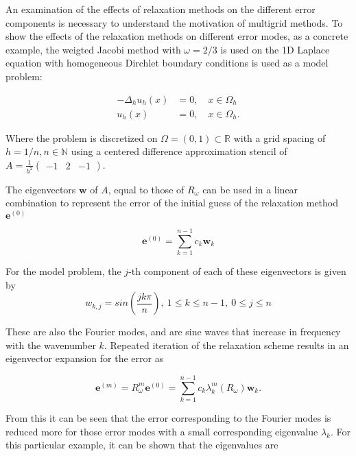 An examination of the effects of relaxation methods on the different error components is necessary to understand the motivation of multigrid methods.
To show the effects of the relaxation methods on different error modes, as a concrete example, the weigted Jacobi method with $\omega = 2/3$ is used on the 1D Laplace equation with homogeneous Dirchlet boundary conditions is used as a model problem:

\begin{equation}
\begin{aligned}
	-\Delta_h u_h(x) &= 0, \quad x \in \Omega_h \\
	u_h(x) &= 0, \quad x \in \Omega_h.
\end{aligned}
\label{eq:model_problem}
\end{equation}

Where the problem is discretized on $\Omega = (0, 1) \subset \mathbb{R}$ with a grid spacing of $h = 1/n, n \in \mathbb{N}$ using a centered difference approximation stencil of $A = \frac{1}{h^2} \begin{pmatrix} -1 & 2 &-1 \end{pmatrix}$.

The eigenvectors $\mathbf{w}$ of $A$, equal to those of $R_{\omega}$ can be used in a linear combination to represent the error of the initial guess of the relaxation method $\mathbf{e}^{(0)}$

\begin{equation}
	\mathbf{e}^{(0)} = \sum_{k=1}^{n-1}{c_{k}\mathbf{w}_{k}}
\end{equation}

For the model problem, the $j$-th component of each of these eigenvectors is given by
\begin{equation}
	w_{k,j} = sin\left(\frac{jk\pi}{n}\right),\ 1 \leq k \leq n-1,\ 0 \leq j \leq n
\end{equation}

These are also the Fourier modes, and are sine waves that increase in frequency with the wavenumber $k$. Repeated iteration of the relaxation scheme results in an eigenvector expansion for the error as

\begin{equation}
	\mathbf{e}^{(m)} = R_{\omega}^m \mathbf{e}^{(0)} = \sum_{k=1}^{n-1}{c_k\lambda_k^m\left( R_{\omega}\right)\mathbf{w}_k}.
\end{equation}

From this it can be seen that the error corresponding to the Fourier modes is reduced more for those error modes with a small corresponding eigenvalue $\lambda_k$. For this particular example, it can be shown that the eigenvalues are

